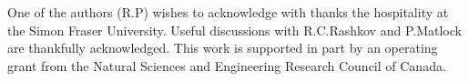 \documentclass[a4paper,12pt]{article}
\begin{document}
{

\vspace{0.5cm}

One of the authors (R.P) wishes to acknowledge with thanks the hospitality 
at the Simon Fraser University. Useful discussions with R.C.Rashkov and 
P.Matlock are thankfully acknowledged. This work is supported in part by an 
operating grant from the Natural Sciences and Engineering Research Council 
of Canada.

\vspace{0.5cm}

{}

\vspace{0.5cm}

\begin{enumerate}


\end{enumerate}}
\end{document}
